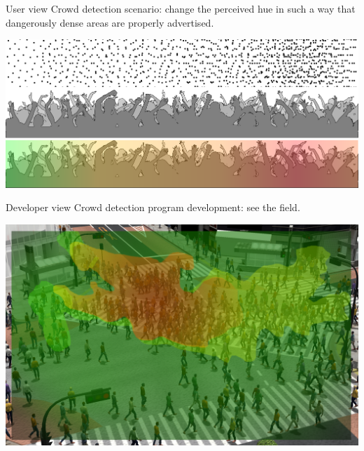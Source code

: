 \documentclass[presentation]{beamer} %
\begin{document}
\begin{frame}{User view}
  Crowd detection scenario: change the perceived hue in such a way that dangerously dense areas are properly advertised.
  \begin{center}
    \includegraphics[width=.99\textwidth]{images/crowdar}
  \end{center}
\end{frame}
\begin{frame}{Developer view}
  Crowd detection program development: see the field.
  \begin{center}
    \includegraphics[width=.85\textwidth]{images/crowd01}
  \end{center}
\end{frame}
\end{document}
